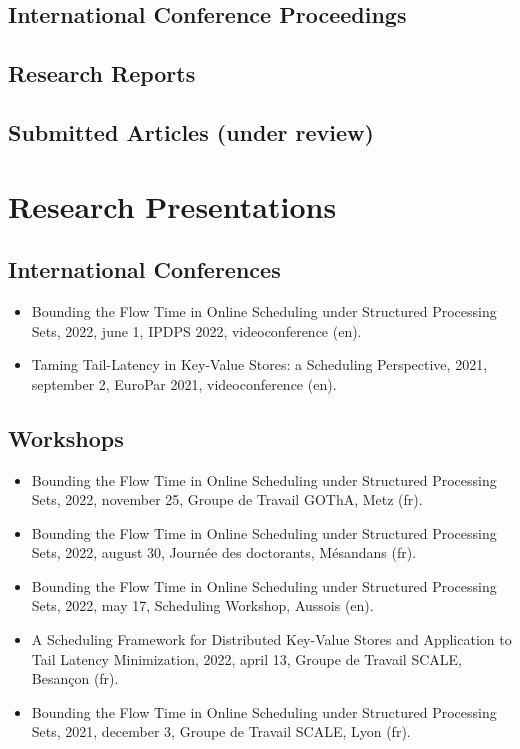 \documentclass[12pt]{article}
\begin{document}
\subsection*{International Conference Proceedings}


\subsection*{Research Reports}


\subsection*{Submitted Articles (under review)}


\section*{Research Presentations}

\subsection*{International Conferences}

\begin{itemize}
  \item Bounding the Flow Time in Online Scheduling under Structured Processing Sets, 2022, june 1,
  IPDPS 2022, videoconference (en).
  \item Taming Tail-Latency in Key-Value Stores: a Scheduling Perspective, 2021, september 2,
  EuroPar 2021, videoconference (en).
\end{itemize}

\subsection*{Workshops}

\begin{itemize}
  \item Bounding the Flow Time in Online Scheduling under Structured Processing Sets, 2022, november
  25, Groupe de Travail GOThA, Metz (fr).
  \item Bounding the Flow Time in Online Scheduling under Structured Processing Sets, 2022, august
  30, Journée des doctorants, Mésandans (fr).
  \item Bounding the Flow Time in Online Scheduling under Structured Processing Sets, 2022, may 17,
  Scheduling Workshop, Aussois (en).
  \item A Scheduling Framework for Distributed Key-Value Stores and Application to Tail Latency
  Minimization, 2022, april 13, Groupe de Travail SCALE, Besançon (fr).
  \item Bounding the Flow Time in Online Scheduling under Structured Processing Sets, 2021, december
  3, Groupe de Travail SCALE, Lyon (fr).
\end{itemize}

% 
% 
\end{document}

